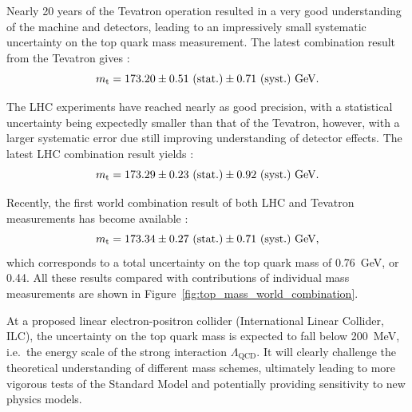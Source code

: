 Nearly 20 years of the Tevatron operation resulted in a very good understanding of the machine and detectors, leading to
an impressively small systematic uncertainty on the top quark mass measurement. The latest combination result from the
Tevatron gives \autocite{tevatron_top_mass_combination}:
\begin{equation}
m_\mathrm{t} = 173.20 \pm 0.51~\textrm{(stat.)} \pm 0.71~\textrm{(syst.)}~\textrm{GeV}.
\end{equation}

The LHC experiments have reached nearly as good precision, with a statistical uncertainty being expectedly smaller
than that of the Tevatron, however, with a larger systematic error due still improving understanding of detector
effects. The latest LHC combination result yields \autocite{LHC_top_mass_combination}:
\begin{equation}
m_\mathrm{t} = 173.29 \pm 0.23~\textrm{(stat.)} \pm 0.92~\textrm{(syst.)}~\textrm{GeV}.
\end{equation}

Recently, the first world combination result of both LHC and Tevatron measurements has become available
\autocite{world_top_mass_combination}:
\begin{equation}
m_\mathrm{t} = 173.34 \pm 0.27~\textrm{(stat.)} \pm 0.71~\textrm{(syst.)}~\textrm{GeV},
\end{equation}
which corresponds to a total uncertainty on the top quark mass of \SI{0.76}{\GeV}, or \SI{0.44}{\pc}. All these results
compared with contributions of individual mass measurements are shown in Figure~\ref{fig:top_mass_world_combination}.

At a proposed linear electron-positron collider (International Linear Collider, ILC), the uncertainty on the top quark
mass is expected to fall below \SI{200}{\MeV}, i.e.\ the energy scale of the strong interaction $\Lambda_\textrm{QCD}$.
It will clearly challenge the theoretical understanding of different mass schemes, ultimately leading to more vigorous
tests of the Standard Model and potentially providing sensitivity to new physics models.

